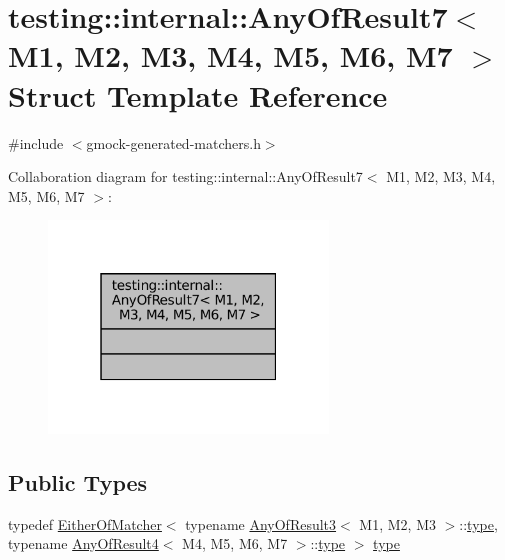 \hypertarget{structtesting_1_1internal_1_1AnyOfResult7}{}\section{testing\+:\+:internal\+:\+:Any\+Of\+Result7$<$ M1, M2, M3, M4, M5, M6, M7 $>$ Struct Template Reference}
\label{structtesting_1_1internal_1_1AnyOfResult7}


{\ttfamily \#include $<$gmock-\/generated-\/matchers.\+h$>$}



Collaboration diagram for testing\+:\+:internal\+:\+:Any\+Of\+Result7$<$ M1, M2, M3, M4, M5, M6, M7 $>$\+:
\nopagebreak
\begin{figure}[H]
\begin{center}
\leavevmode
\includegraphics[width=211pt]{structtesting_1_1internal_1_1AnyOfResult7__coll__graph}
\end{center}
\end{figure}
\subsection*{Public Types}
\begin{DoxyCompactItemize}
\item 
typedef \hyperlink{classtesting_1_1internal_1_1EitherOfMatcher}{Either\+Of\+Matcher}$<$ typename \hyperlink{structtesting_1_1internal_1_1AnyOfResult3}{Any\+Of\+Result3}$<$ M1, M2, M3 $>$\+::\hyperlink{structtesting_1_1internal_1_1AnyOfResult7_a976873478921520833464a86f840abe8}{type}, typename \hyperlink{structtesting_1_1internal_1_1AnyOfResult4}{Any\+Of\+Result4}$<$ M4, M5, M6, M7 $>$\+::\hyperlink{structtesting_1_1internal_1_1AnyOfResult7_a976873478921520833464a86f840abe8}{type} $>$ \hyperlink{structtesting_1_1internal_1_1AnyOfResult7_a976873478921520833464a86f840abe8}{type}
\end{DoxyCompactItemize}



